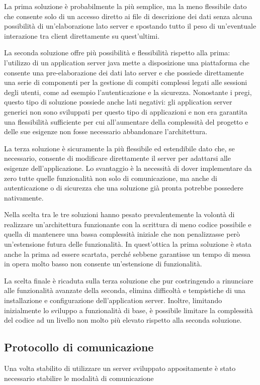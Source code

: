 La prima soluzione è probabilmente la più semplice, ma la meno flessibile dato che consente solo di un accesso diretto ai file di descrizione dei dati senza alcuna possibilità di un'elaborazione lato server e spostando tutto il peso di un'eventuale interazione tra client direttamente su quest'ultimi.

La seconda soluzione offre più possibilità e flessibilità rispetto alla prima: l'utilizzo di un application server java mette a disposizione una piattaforma che consente una pre-elaborazione dei dati lato server e che possiede direttamente una serie di componenti per la gestione di compiti complessi legati alle sessioni degli utenti, come ad esempio l'autenticazione e la sicurezza. Nonostante i pregi, questo tipo di soluzione possiede anche lati negativi: gli application server generici non sono sviluppati per questo tipo di applicazioni e non era garantita una flessibilità sufficiente per cui all'aumentare della complessità del progetto e delle sue esigenze non fosse necessario abbandonare l'architettura. 

La terza soluzione è sicuramente la più flessibile ed estendibile dato che, se necessario, consente di modificare direttamente il server per adattarsi alle esigenze dell'applicazione. Lo svantaggio è la necessità di dover implementare da zero tutte quelle funzionalità non solo di comunicazione, ma anche di autenticazione o di sicurezza che una soluzione già pronta potrebbe possedere nativamente.

Nella scelta tra le tre soluzioni hanno pesato prevalentemente la volontà di realizzare un'architettura funzionante con la scrittura di meno codice possibile e quella di mantenere una bassa complessità iniziale che non penalizzasse però un'estensione futura delle funzionalità. In quest'ottica la prima soluzione è stata anche la prima ad essere scartata, perché sebbene garantisse un tempo di messa in opera molto basso non consente un'estensione di funzionalità. 

La scelta finale è ricaduta sulla terza soluzione che pur costringendo a rinunciare alle funzionalità avanzate della seconda, elimina difficoltà e tempistiche di una installazione e configurazione dell'application server. Inoltre, limitando inizialmente lo sviluppo a funzionalità di base, è possibile limitare la complessità del codice ad un livello non molto più elevato rispetto alla seconda soluzione.

\subsection{Protocollo di comunicazione}
\label{sub:comprotocol}
Una volta stabilito di utilizzare un server sviluppato appositamente è stato necessario stabilire le modalità di comunicazione




